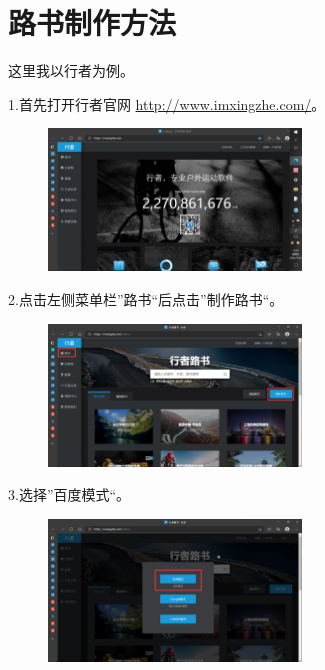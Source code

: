 \documentclass{ctexbook}
\begin{document}
\section{路书制作方法}
\label{chapter：路书制作方法}
这里我以行者为例。

1.首先打开行者官网 \href{http://www.imxingzhe.com/}{http://www.imxingzhe.com/}。

        \begin{figure}[H]
            \begin{center}
            \includegraphics[width=0.6\textwidth]{fig/行者1}
            \end{center}
        \end{figure}

2.点击左侧菜单栏''路书``后点击''制作路书``。
       \begin{figure}[H]
            \begin{center}
            \includegraphics[width=0.6\textwidth]{fig/行者2}
            \end{center}
        \end{figure}

3.选择''百度模式``。
       \begin{figure}[H]
            \begin{center}
            \includegraphics[width=0.6\textwidth]{fig/行者3}
            \end{center}
        \end{figure}
\end{document}
